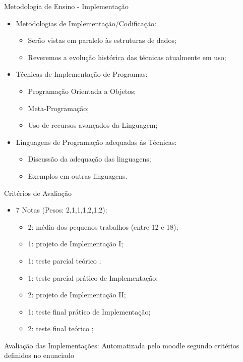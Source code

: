 \documentclass[12pt]{beamer}
\begin{document}
\begin{frame}{Metodologia de Ensino - Implementação}
\begin{itemize}
\item Metodologias de Implementação/Codificação:
\begin{itemize}
\item Serão vistas em paralelo às estruturas de dados;
\item Reveremos a evolução histórica das técnicas atualmente em uso;
\end{itemize}
\item Técnicas de Implementação de Programas:
\begin{itemize}
\item Programação Orientada a Objetos;
\item Meta-Programação;
\item Uso de recursos avançados da Linguagem;
\end{itemize}
\item Linguagens de Programação adequadas às Técnicas:
\begin{itemize}
\item Discussão da adequação das linguagens;
\item Exemplos em outras linguagens.
\end{itemize}
\end{itemize}
\end{frame}

\begin{frame}{Critérios de Avaliação}
\begin{itemize}
\item 7 Notas (Pesos: 2,1,1,1,2,1,2):
\begin{itemize}
\item 2: média dos pequenos trabalhos (entre 12 e 18);
\item 1: projeto de Implementação I;
\item 1: teste parcial teórico ;
\item 1: teste parcial prático de Implementação;
\item 2: projeto de Implementação II;
\item 1: teste final prático de Implementação;
\item 2: teste final teórico ;
\end{itemize}
\end{itemize}
\begin{block}{Avaliação das Implementações:}
Automatizada pelo moodle segundo critérios definidos no enunciado
\end{block}
\end{frame}
\end{document}
